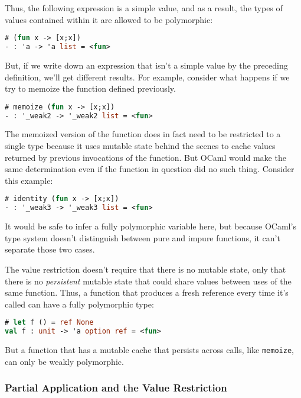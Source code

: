 Thus, the following expression is a simple value, and as a result, the
types of values contained within it are allowed to be polymorphic:

\begin{lstlisting}[language=Caml]
# (fun x -> [x;x])
- : 'a -> 'a list = <fun>
\end{lstlisting}

But, if we write down an expression that isn't a simple value by the
preceding definition, we'll get different results. For example, consider
what happens if we try to memoize the function defined previously.

\begin{lstlisting}[language=Caml]
# memoize (fun x -> [x;x])
- : '_weak2 -> '_weak2 list = <fun>
\end{lstlisting}

The memoized version of the function does in fact need to be restricted
to a single type because it uses mutable state behind the scenes to
cache values returned by previous invocations of the function. But OCaml
would make the same determination even if the function in question did
no such thing. Consider this example:

\begin{lstlisting}[language=Caml]
# identity (fun x -> [x;x])
- : '_weak3 -> '_weak3 list = <fun>
\end{lstlisting}

It would be safe to infer a fully polymorphic variable here, but because
OCaml's type system doesn't distinguish between pure and impure
functions, it can't separate those two cases.

The value restriction doesn't require that there is no mutable state,
only that there is no \emph{persistent} mutable state that could share
values between uses of the same function. Thus, a function that produces
a fresh reference every time it's called can have a fully polymorphic
type:

\begin{lstlisting}[language=Caml]
# let f () = ref None
val f : unit -> 'a option ref = <fun>
\end{lstlisting}

But a function that has a mutable cache that persists across calls, like
\passthrough{\lstinline!memoize!}, can only be weakly polymorphic.

\hypertarget{partial-application-and-the-value-restriction}{%
\subsubsection{Partial Application and the Value
Restriction}\label{partial-application-and-the-value-restriction}}


